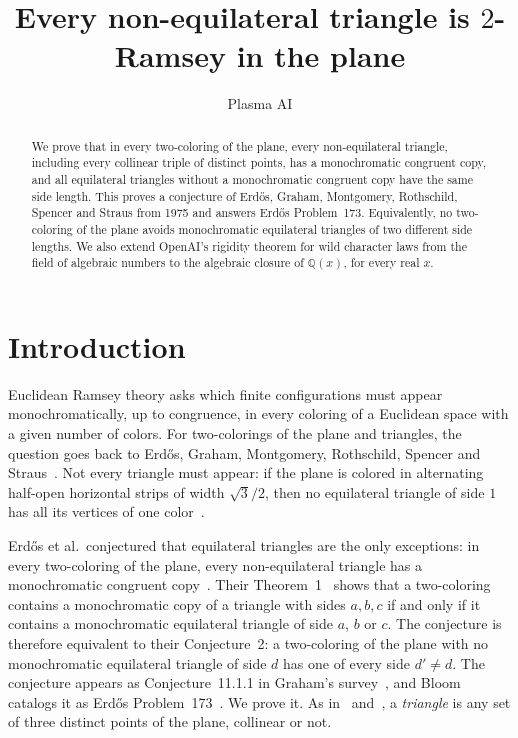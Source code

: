 \documentclass[10pt]{article}
\title{Every non-equilateral triangle is $2$-Ramsey in the plane}
\author{Plasma AI}
\date{}
\theoremstyle{remark}
\newcommand{\Q}{\mathbb Q}
\begin{document}
\maketitle

\begin{abstract}
We prove that in every two-coloring of the plane, every non-equilateral triangle, including every collinear triple of distinct points, has a monochromatic congruent copy, and all equilateral triangles without a monochromatic congruent copy have the same side length. This proves a conjecture of Erd\H{o}s, Graham, Montgomery, Rothschild, Spencer and Straus from 1975 and answers Erd\H{o}s Problem~173. Equivalently, no two-coloring of the plane avoids monochromatic equilateral triangles of two different side lengths. We also extend OpenAI's rigidity theorem for wild character laws from the field of algebraic numbers to the algebraic closure of $\Q(x)$, for every real $x$.
\end{abstract}

\section{Introduction}

Euclidean Ramsey theory asks which finite configurations must appear monochromatically, up to congruence, in every coloring of a Euclidean space with a given number of colors. For two-colorings of the plane and triangles, the question goes back to Erd\H{o}s, Graham, Montgomery, Rothschild, Spencer and Straus~\cite{EGMRSS}. Not every triangle must appear: if the plane is colored in alternating half-open horizontal strips of width $\sqrt3/2$, then no equilateral triangle of side $1$ has all its vertices of one color~\cite[pp.~559--560]{EGMRSS}.

Erd\H{o}s et al.\ conjectured that equilateral triangles are the only exceptions: in every two-coloring of the plane, every non-equilateral triangle has a monochromatic congruent copy~\cite[Conjecture~3, p.~560]{EGMRSS}. Their Theorem~1~\cite[p.~563]{EGMRSS} shows that a two-coloring contains a monochromatic copy of a triangle with sides $a,b,c$ if and only if it contains a monochromatic equilateral triangle of side $a$, $b$ or $c$. The conjecture is therefore equivalent to their Conjecture~2: a two-coloring of the plane with no monochromatic equilateral triangle of side $d$ has one of every side $d'\ne d$. The conjecture appears as Conjecture~11.1.1 in Graham's survey~\cite{Graham}, and Bloom catalogs it as Erd\H{o}s Problem~173~\cite{Bloom173}. We prove it. As in~\cite{EGMRSS} and~\cite[p.~2]{JKSV}, a \emph{triangle} is any set of three distinct points of the plane, collinear or not.
\end{document}
